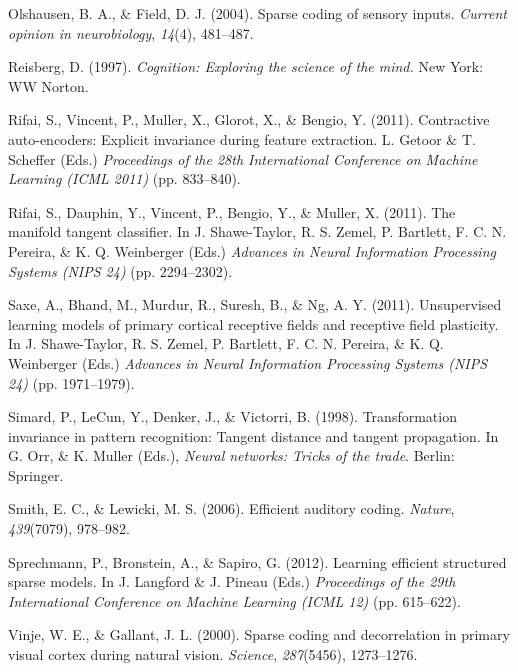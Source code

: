 \documentclass{article} %
\begin{document}
\begin{thebibliography}{100}
Olshausen, B. A., \& Field, D. J. (2004). 
\newblock Sparse coding of sensory inputs. 
\newblock \emph{Current opinion in neurobiology}, \emph{14}(4), 481--487.

Reisberg, D. (1997). 
\newblock \emph{Cognition: Exploring the science of the mind.}
\newblock New York: WW Norton.

Rifai, S., Vincent, P., Muller, X., Glorot, X., \& Bengio, Y. (2011). 
\newblock Contractive auto-encoders: Explicit invariance during feature extraction. 
\newblock L. Getoor \& T. Scheffer (Eds.) \emph{Proceedings of the 28th International Conference on Machine Learning (ICML 2011)} (pp. 833--840).

Rifai, S., Dauphin, Y., Vincent, P., Bengio, Y., \& Muller, X. (2011). 
\newblock The manifold tangent classifier. 
\newblock In J. Shawe-Taylor, R. S. Zemel, P. Bartlett, F. C. N. Pereira, \& K. Q. Weinberger (Eds.) \emph{Advances in Neural Information Processing Systems (NIPS 24)} (pp. 2294--2302). %

Saxe, A., Bhand, M., Murdur, R., Suresh, B., \& Ng, A. Y. (2011).
\newblock Unsupervised learning models of primary cortical receptive ﬁelds and receptive ﬁeld plasticity.
\newblock In J. Shawe-Taylor, R. S. Zemel, P. Bartlett, F. C. N. Pereira, \& K. Q. Weinberger (Eds.) \emph{Advances in Neural Information Processing Systems (NIPS 24)} (pp. 1971--1979). %

Simard, P., LeCun, Y., Denker, J., \& Victorri, B. (1998). 
\newblock Transformation invariance in pattern recognition: Tangent distance and tangent propagation. 
\newblock In G. Orr,  \& K. Muller (Eds.), \emph{Neural networks: Tricks of the trade}. Berlin: Springer. 

Smith, E. C., \& Lewicki, M. S. (2006). 
\newblock Efficient auditory coding. 
\newblock \emph{Nature}, \emph{439}(7079), 978--982.

Sprechmann, P., Bronstein, A., \& Sapiro, G. (2012).
\newblock Learning efficient structured sparse models.
\newblock In J. Langford \& J. Pineau (Eds.) \emph{Proceedings of the 29th International Conference on Machine Learning (ICML 12)} (pp. 615--622).

Vinje, W. E., \& Gallant, J. L. (2000). 
\newblock Sparse coding and decorrelation in primary visual cortex during natural vision. 
\newblock \emph{Science}, \emph{287}(5456), 1273--1276.

\end{thebibliography}
\end{document}

